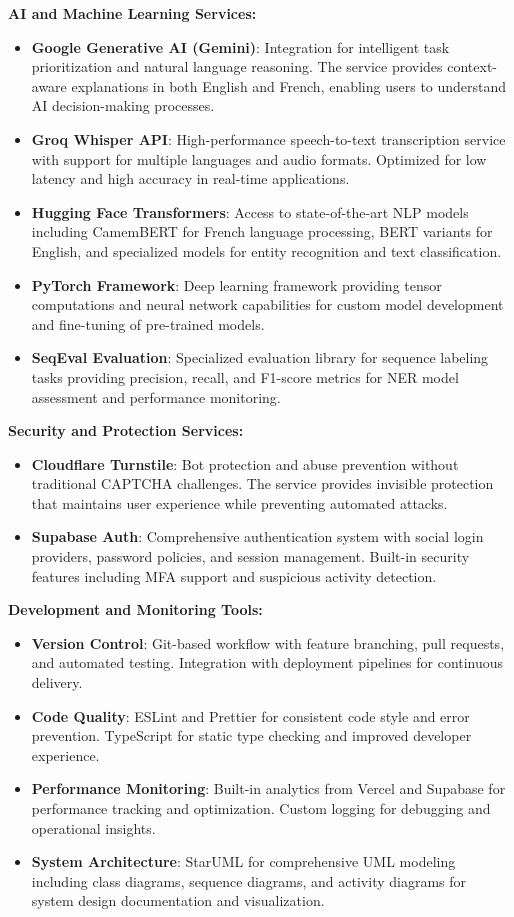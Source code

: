 \documentclass[12pt,a4paper]{article}
\begin{document}
\textbf{AI and Machine Learning Services:}
\begin{itemize}
  \item \textbf{Google Generative AI (Gemini)}: Integration for intelligent task prioritization and natural language reasoning. The service provides context-aware explanations in both English and French, enabling users to understand AI decision-making processes.
  \item \textbf{Groq Whisper API}: High-performance speech-to-text transcription service with support for multiple languages and audio formats. Optimized for low latency and high accuracy in real-time applications.
  \item \textbf{Hugging Face Transformers}: Access to state-of-the-art NLP models including CamemBERT for French language processing, BERT variants for English, and specialized models for entity recognition and text classification.
  \item \textbf{PyTorch Framework}: Deep learning framework providing tensor computations and neural network capabilities for custom model development and fine-tuning of pre-trained models.
  \item \textbf{SeqEval Evaluation}: Specialized evaluation library for sequence labeling tasks providing precision, recall, and F1-score metrics for NER model assessment and performance monitoring.
\end{itemize}

\textbf{Security and Protection Services:}
\begin{itemize}
  \item \textbf{Cloudflare Turnstile}: Bot protection and abuse prevention without traditional CAPTCHA challenges. The service provides invisible protection that maintains user experience while preventing automated attacks.
  \item \textbf{Supabase Auth}: Comprehensive authentication system with social login providers, password policies, and session management. Built-in security features including MFA support and suspicious activity detection.
\end{itemize}

\textbf{Development and Monitoring Tools:}
\begin{itemize}
  \item \textbf{Version Control}: Git-based workflow with feature branching, pull requests, and automated testing. Integration with deployment pipelines for continuous delivery.
  \item \textbf{Code Quality}: ESLint and Prettier for consistent code style and error prevention. TypeScript for static type checking and improved developer experience.
  \item \textbf{Performance Monitoring}: Built-in analytics from Vercel and Supabase for performance tracking and optimization. Custom logging for debugging and operational insights.
  \item \textbf{System Architecture}: StarUML for comprehensive UML modeling including class diagrams, sequence diagrams, and activity diagrams for system design documentation and visualization.
\end{itemize}
\end{document}

